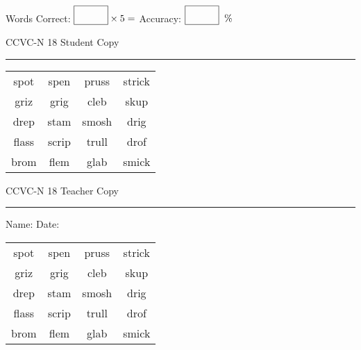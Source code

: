 \documentclass{memoir}
\begin{document}
\small

Words Correct: $\fbox{\phantom{\huge 100}} \times 5 = $ Accuracy: $\fbox{\phantom{\huge 100}}\;\; \%$ 

\vfill

\newpage


\footnotesize \noindent
CCVC-N 18 \hfill Student Copy
\smallskip
\hrule

\Large

\setlength{\tabcolsep}{14pt}
\def\arraystretch{3}

{\selectfont


\begin{vplace}[0.5]
\begin{center}
\begin{tabular}{cccc}
spot & spen & pruss       & strick \\
griz & grig      & cleb & skup \\
drep & stam            & smosh & drig        \\
flass & scrip & trull & drof \\
brom          & flem & glab & smick \\
\end{tabular}
\end{center}
\end{vplace}

}

\newpage

\footnotesize \noindent
CCVC-N 18 \hfill Teacher Copy
\smallskip
\hrule

\small

\vfill

\noindent
Name: \underline{\hspace{1.75in}} \hfill Date: \underline{\hspace{1in}}

\Large

{\selectfont


\begin{vplace}[0.5]
\begin{center}
\begin{tabular}{cccc}
spot & spen & pruss       & strick \\
griz & grig      & cleb & skup \\
drep & stam            & smosh & drig        \\
flass & scrip & trull & drof \\
brom          & flem & glab & smick \\
\end{tabular}
\end{center}
\end{vplace}



}
\end{document}
